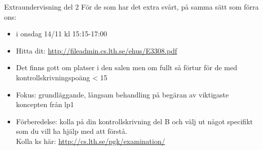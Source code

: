 \begin{Slide}{Extraundervisning del 2}
För de som har det extra svårt, på samma sätt som förra ons:
\begin{itemize}
\item  {} i  onsdag 14/11 kl 15:15-17:00
\item Hitta dit: \url{http://fileadmin.cs.lth.se/ehus/E3308.pdf}
\item Det finns gott om platser i den salen men om fullt så förtur för de med kontrollskrivningspoäng < 15
\item Fokus: grundläggande, långsam behandling på begäran av viktigaste koncepten från lp1
\item Förberedelse: kolla på din kontrollskrivning del B och välj ut något specifikt som du vill ha hjälp med att förstå. \\ Kolla ks här: \url{http://cs.lth.se/pgk/examination/}
\end{itemize}
\end{Slide}


\fi
